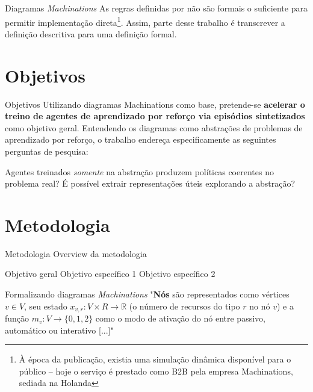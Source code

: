 \documentclass[aspectratio=169]{beamer}
\begin{document}
\begin{frame}{Diagramas \textit{Machinations}}
    As regras definidas por \citeauthor{machinations} não são formais o suficiente para permitir implementação direta\footnote{À época da publicação, existia uma simulação dinâmica disponível para o público -- hoje o serviço é prestado como B2B pela empresa Machinations, sediada na Holanda}. Assim, parte desse trabalho é transcrever a definição descritiva para uma definição formal.
\end{frame}

\section{Objetivos}

\begin{frame}{Objetivos}
    Utilizando diagramas Machinations como base, pretende-se \textbf{acelerar o treino de agentes de aprendizado por reforço via episódios sintetizados} como objetivo geral. Entendendo os diagramas como abstrações de problemas de aprendizado por reforço, o trabalho endereça especificamente as seguintes perguntas de pesquisa:
    \begin{outline}
        \1 Agentes treinados \textit{somente} na abstração produzem políticas coerentes no problema real?
        \1 É possível extrair representações úteis explorando a abstração?
    \end{outline}
\end{frame}

\section{Metodologia}

\begin{frame}{Metodologia}
    Overview da metodologia
    \begin{outline}
        \1 Objetivo geral
            \2 Objetivo específico 1
            \2 Objetivo específico 2
    \end{outline}
\end{frame}

\begin{frame}{Formalizando diagramas \textit{Machinations}}
    "\textbf{Nós} são representados como vértices $v \in V$, seu estado $x_{v,r}: V \times R \rightarrow \mathbb{R}$ (o número de recursos do tipo $r$ no nó $v$) e a função $m_{v}: V \rightarrow \{0,1,2\}$ como o modo de ativação do nó entre passivo, automático ou interativo [...]"
\end{frame}
\end{document}
